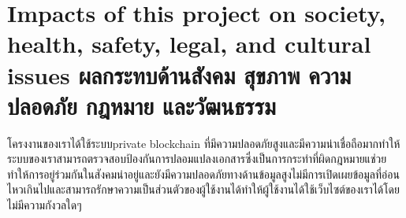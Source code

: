 \section{\ifenglish%
Impacts of this project on society, health, safety, legal, and cultural issues
\else%
ผลกระทบด้านสังคม สุขภาพ ความปลอดภัย กฎหมาย และวัฒนธรรม
\fi}
\enskip \enskip \enskip \enskip \enskip 
โครงงานของเราได้ใช้ระบบprivate blockchain ที่มีความปลอดภัยสูงและมีความน่าเชื่อถือมากทำให้ระบบของเราสามารถตรวจสอบป้องกันการปลอมแปลงเอกสารซึ่งเป็นการกระทำที่ผิดกฎหมายแช่วยทำให้การอยู่ร่วมกันในสังคมน่าอยู่และยังมีความปลอดภัยทางด้านข้อมูลสูงไม่มีการเปิดเผยข้อมูลที่อ่อนไหวเกินไปและสามารถรักษาความเป็นส่วนตัวของผู้ใช้งานได้ทำให้ผู้ใช้งานได้ใช้เว็บไซต์ของเราได้โดยไม่มีความกังวลใดๆ





